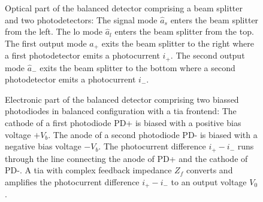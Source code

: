 % 

\begin{figure}[htb]
    \centering
    
    \caption{Optical part of the balanced detector comprising a beam splitter and two photodetectors: The signal mode $\hat{a}_s$ enters the beam splitter from the left. The \gls{lo} mode $\hat{a}_l$ enters the beam splitter from the top. The first output mode $\hat{a}_+$ exits the beam splitter to the right where a first photodetector emits a photocurrent $i_+$. The second output mode $\hat{a}_-$ exits the beam splitter to the bottom where a second photodetector emits a photocurrent $i_-$.}\label{fig:balanced_detector_optics}
\end{figure}

\begin{figure}[htb]
    \centering
    
    \caption{Electronic part of the balanced detector comprising two biassed photodiodes in balanced configuration with a \gls{tia} frontend: The cathode of a first photodiode PD+ is biased with a positive bias voltage $+V_b$. The anode of a second photodiode PD- is biased with a negative bias voltage $-V_b$. The photocurrent difference $i_+-i_-$ runs through the line connecting the anode of PD+ and the cathode of PD-. A \gls{tia} with complex feedback impedance $Z_f$ converts and amplifies the photocurrent difference $i_+-i_-$ to an output voltage $V_0$.}\label{fig:balanced_detector_electronics}
\end{figure}
